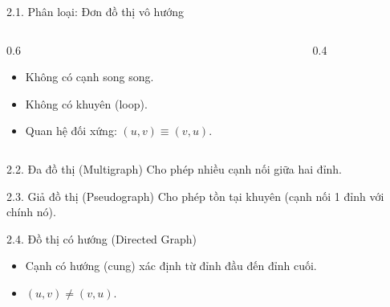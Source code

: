 \documentclass[10pt, xcolor={dvipsnames}]{beamer}
\begin{document}
\begin{frame}{2.1. Phân loại: Đơn đồ thị vô hướng}
    \begin{columns}
        \begin{column}{0.6\textwidth}
            \begin{itemize}
                \item Không có cạnh song song.
                \item Không có khuyên (loop).
                \item Quan hệ đối xứng: $(u,v) \equiv (v,u)$.
            \end{itemize}
        \end{column}
        \begin{column}{0.4\textwidth}
            \centering
        \end{column}
    \end{columns}
\end{frame}

\begin{frame}{2.2. Đa đồ thị (Multigraph)}
    Cho phép nhiều cạnh nối giữa hai đỉnh.
    \centering
\end{frame}

\begin{frame}{2.3. Giả đồ thị (Pseudograph)}
    Cho phép tồn tại khuyên (cạnh nối 1 đỉnh với chính nó).
    \centering
\end{frame}

\begin{frame}{2.4. Đồ thị có hướng (Directed Graph)}
    \begin{itemize}
        \item Cạnh có hướng (cung) xác định từ đỉnh đầu đến đỉnh cuối.
        \item $(u,v) \neq (v,u)$.
    \end{itemize}
    \centering
\end{frame}
\end{document}
